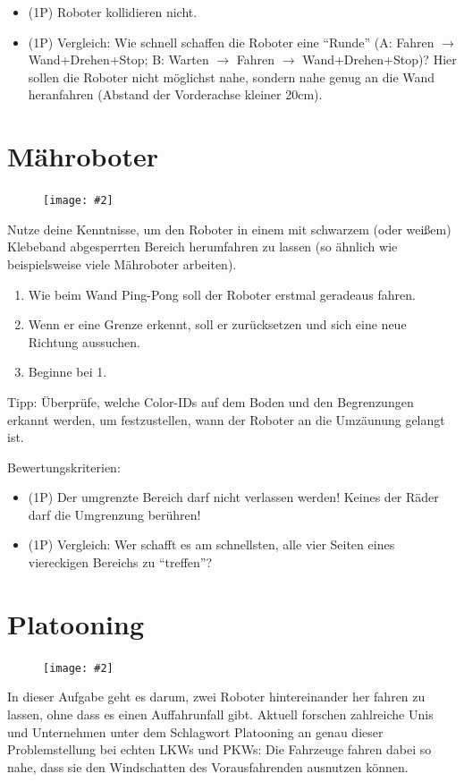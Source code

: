 \documentclass[
	12pt,
	article,
	type=bsc, %
	colorbacktitle,
	instlogo,
	accentcolor=tud1c,
	draft,
	german,
	twoside
]{tudexercise}
\newcommand{\easygcenter}[2]{
	\begin{figure}[h]
	\centering 
	\texttt{[image: \#2]}
	\end{figure}
}
\begin{document}
	\begin{itemize}
	\item (1P) Roboter kollidieren nicht.
	\item (1P) Vergleich: Wie schnell schaffen die Roboter eine “Runde” (A: Fahren $\rightarrow$ Wand+Drehen+Stop; B: Warten $\rightarrow$ Fahren $\rightarrow$ Wand+Drehen+Stop)? Hier sollen die Roboter nicht möglichst nahe, sondern nahe genug an die Wand heranfahren (Abstand der Vorderachse kleiner 20cm).
	\end{itemize}
	
	\newpage
	\section{Mähroboter}
	\easygcenter{.8\textwidth}{img/task_maehroboter.jpg}
	Nutze deine Kenntnisse, um den Roboter in einem mit schwarzem (oder weißem) Klebeband abgesperrten Bereich herumfahren zu lassen (so ähnlich wie beispielsweise viele Mähroboter arbeiten).
	\begin{enumerate}
	\item Wie beim Wand Ping-Pong soll der Roboter erstmal geradeaus fahren.
	\item Wenn er eine Grenze erkennt, soll er zurücksetzen und sich eine neue Richtung aussuchen.
	\item Beginne bei 1.
	\end{enumerate}
	
	Tipp: Überprüfe, welche Color-IDs auf dem Boden und den Begrenzungen erkannt werden, um festzustellen, wann der Roboter an die Umzäunung gelangt ist.
	
	Bewertungskriterien:
	\begin{itemize}
	\item (1P) Der umgrenzte Bereich darf nicht verlassen werden! Keines der Räder darf die Umgrenzung berühren!
	\item (1P) Vergleich: Wer schafft es am schnellsten, alle vier Seiten eines viereckigen Bereichs zu “treffen”?
	\end{itemize}
	
	\newpage
	\section{Platooning}
	\easygcenter{.8\textwidth}{img/task_platooning.jpg}
	In dieser Aufgabe geht es darum, zwei Roboter hintereinander her fahren zu lassen, ohne dass es einen Auffahrunfall gibt. Aktuell forschen zahlreiche Unis und Unternehmen unter dem Schlagwort Platooning an genau dieser Problemstellung bei echten LKWs und PKWs: Die Fahrzeuge fahren dabei so nahe, dass sie den Windschatten des Vorausfahrenden ausnutzen können.
	
\end{document}
